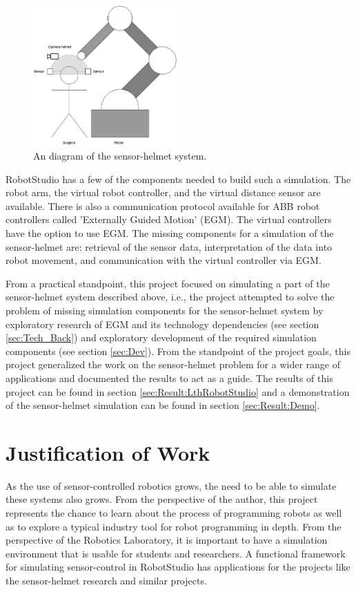 \documentclass{cslthse-msc}
\begin{document}
\begin{figure}[H]
    \centering
    \includegraphics[width=5.5cm]{demo_mockup.jpg}
    \caption{An diagram of the sensor-helmet system.}
    \label{fig:demo_model}
\end{figure}
RobotStudio has a few of the components needed to build such a simulation. The robot arm, the virtual robot controller, and the virtual distance sensor are available. There is also a communication protocol available for ABB robot controllers called 'Externally Guided Motion' (EGM). The virtual controllers have the option to use EGM. The missing components for a simulation of the sensor-helmet are: retrieval of the sensor data, interpretation of the data into robot movement, and communication with the virtual controller via EGM.\par

From a practical standpoint, this project focused on simulating a part of the sensor-helmet system described above, i.e., the project attempted to solve the problem of missing simulation components for the sensor-helmet system by exploratory research of EGM and its technology dependencies (see section \ref{sec:Tech_Back}) and exploratory development of the required simulation components (see section \ref{sec:Dev}). From the standpoint of the project goals, this project generalized the work on the sensor-helmet problem for a wider range of applications and documented the results to act as a guide. The results of this project can be found in section \ref{sec:Result:LthRobotStudio} and a demonstration of the sensor-helmet simulation can be found in section \ref{sec:Result:Demo}. \par


\section{Justification of Work}
\label{sec:Intro:Justification}
As the use of sensor-controlled robotics grows, the need to be able to simulate these systems also grows. From the perspective of the author, this project represents the chance to learn about the process of programming robots as well as to explore a typical industry tool for robot programming in depth. From the perspective of the Robotics Laboratory, it is important to have a simulation environment that is usable for students and researchers. A functional framework for simulating sensor-control in RobotStudio has applications for the projects like the sensor-helmet research and similar projects.
\end{document}
